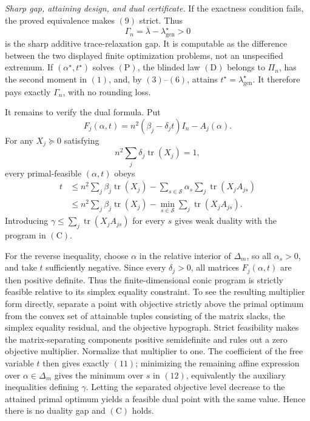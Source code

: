 \textit{Sharp gap, attaining design, and dual certificate.}
If the exactness condition fails, the proved equivalence makes \((9)\) strict. Thus
\[
\Gamma_n=\overline\lambda-\lambda_{\mathrm{gen}}^\star>0
\]
is the sharp additive trace-relaxation gap. It is computable as the difference between the two displayed finite optimization problems, not an unspecified extremum. If \((\alpha^\star,t^\star)\) solves \((\mathrm P)\), the blinded law \((\mathrm D)\) belongs to \(\Pi_n\), has the second moment in \((1)\), and, by \((3)\)--\((6)\), attains \(t^\star=\lambda_{\mathrm{gen}}^\star\). It therefore pays exactly \(\Gamma_n\), with no rounding loss.

It remains to verify the dual formula. Put
\[
F_j(\alpha,t)=n^2(\beta_j-\delta_jt)I_n-A_j(\alpha).
\]
For any \(X_j\succeq0\) satisfying
\[
n^2\sum_j\delta_j\operatorname{tr}(X_j)=1,
\tag{11}
\]
every primal-feasible \((\alpha,t)\) obeys
\[
\begin{aligned}
t
&\le n^2\sum_j\beta_j\operatorname{tr}(X_j)
-\sum_{s\in\mathscr S}\alpha_s
  \sum_j\operatorname{tr}(X_jA_{js})\\
&\le n^2\sum_j\beta_j\operatorname{tr}(X_j)
-\min_{s\in\mathscr S}\sum_j\operatorname{tr}(X_jA_{js}).
\end{aligned}
\tag{12}
\]
Introducing \(\gamma\le\sum_j\operatorname{tr}(X_jA_{js})\) for every \(s\) gives weak duality with the program in \((\mathrm C)\).

For the reverse inequality, choose \(\alpha\) in the relative interior of \(\Delta_m\), so all \(\alpha_s>0\), and take \(t\) sufficiently negative. Since every \(\delta_j>0\), all matrices \(F_j(\alpha,t)\) are then positive definite. Thus the finite-dimensional conic program is strictly feasible relative to its simplex equality constraint. To see the resulting multiplier form directly, separate a point with objective strictly above the primal optimum from the convex set of attainable tuples consisting of the matrix slacks, the simplex equality residual, and the objective hypograph. Strict feasibility makes the matrix-separating components positive semidefinite and rules out a zero objective multiplier. Normalize that multiplier to one. The coefficient of the free variable \(t\) then gives exactly \((11)\); minimizing the remaining affine expression over \(\alpha\in\Delta_m\) gives the minimum over \(s\) in \((12)\), equivalently the auxiliary inequalities defining \(\gamma\). Letting the separated objective level decrease to the attained primal optimum yields a feasible dual point with the same value. Hence there is no duality gap and \((\mathrm C)\) holds.

